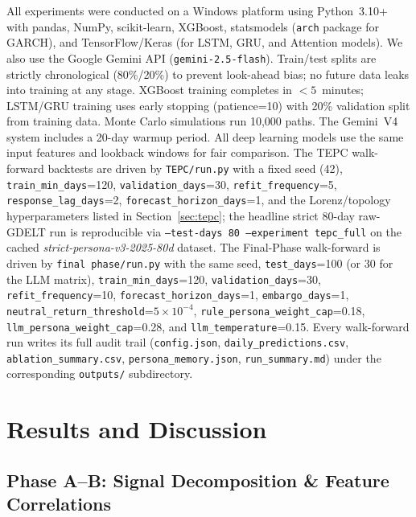 \documentclass[11pt]{article}
\begin{document}
\begin{sloppypar}
All experiments were conducted on a Windows platform using Python~3.10+ with pandas, NumPy, scikit-learn, XGBoost, statsmodels (\texttt{arch} package for GARCH), and TensorFlow/Keras (for LSTM, GRU, and Attention models).
We also use the Google Gemini API (\texttt{gemini-2.5-flash}).
Train/test splits are strictly chronological (80\%/20\%) to prevent look-ahead bias; no future data leaks into training at any stage.
XGBoost training completes in ${<}5$~minutes; LSTM/GRU training uses early stopping (patience=10) with 20\% validation split from training data.
Monte Carlo simulations run 10,000 paths.
The Gemini~V4 system includes a 20-day warmup period.
All deep learning models use the same input features and lookback windows for fair comparison.
The TEPC walk-forward backtests are driven by \texttt{TEPC/run.py} with a fixed seed (42), \texttt{train\_min\_days}=120, \texttt{validation\_days}=30, \texttt{refit\_frequency}=5, \texttt{response\_lag\_days}=2, \texttt{forecast\_horizon\_days}=1, and the Lorenz/topology hyperparameters listed in Section~\ref{sec:tepc}; the headline strict 80-day raw-GDELT run is reproducible via \texttt{--test-days~80 --experiment~tepc\_full} on the cached \textit{strict-persona-v3-2025-80d} dataset. The Final-Phase walk-forward is driven by \texttt{final phase/run.py} with the same seed, \texttt{test\_days}=100 (or 30 for the LLM matrix), \texttt{train\_min\_days}=120, \texttt{validation\_days}=30, \texttt{refit\_frequency}=10, \texttt{forecast\_horizon\_days}=1, \texttt{embargo\_days}=1, \texttt{neutral\_return\_threshold}=$5\!\times\!10^{-4}$, \texttt{rule\_persona\_weight\_cap}=0.18, \texttt{llm\_persona\_weight\_cap}=0.28, and \texttt{llm\_temperature}=0.15. Every walk-forward run writes its full audit trail (\texttt{config.json}, \texttt{daily\_predictions.csv}, \texttt{ablation\_summary.csv}, \texttt{persona\_memory.json}, \texttt{run\_summary.md}) under the corresponding \texttt{outputs/} subdirectory.
\end{sloppypar}

\section{Results and Discussion}
\label{sec:results}

\subsection{Phase A--B: Signal Decomposition \& Feature Correlations}
\end{document}
